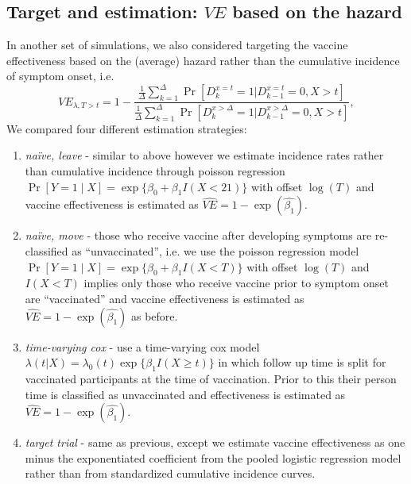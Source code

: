 \begin{appendices}
\begin{refsection}
    \subsection{Target and estimation: $VE$ based on the hazard}
    In another set of simulations, we also considered targeting the vaccine effectiveness based on the  (average) hazard rather than the cumulative incidence of symptom onset, i.e.
    $$
    VE_{\lambda,T > t} = 1 - \dfrac{\frac{1}{\Delta}\sum_{k=1}^{\Delta}\Pr[D_k^{x = t} = 1 | D_{k-1}^{x=t} = 0, X > t]}{\frac{1}{\Delta}\sum_{k=1}^{\Delta}\Pr[D_k^{x > \Delta} = 1 | D_{k-1}^{x > \Delta} = 0, X > t]},
    $$
    We compared four different estimation strategies:
    \begin{enumerate}
        \item \textit{na\"{i}ve, leave} - similar to above however we estimate incidence rates rather than cumulative incidence through poisson regression $\Pr[Y = 1 \mid X] = \operatorname{exp}\{\beta_0 + \beta_1 I(X < 21)\}$ with offset $\log(T)$ and vaccine effectiveness is estimated as $\widehat{VE} = 1 - \exp(\widehat{\beta_1})$.
        \item \textit{na\"{i}ve, move} - those who receive vaccine after developing symptoms are re-classified as ``unvaccinated'', i.e. we use the poisson regression model $\Pr[Y = 1 \mid X] = \operatorname{exp}\{\beta_0 + \beta_1 I(X < T)\}$ with offset $\log(T)$ and $I(X<T)$ implies only those who receive vaccine prior to symptom onset are ``vaccinated'' and vaccine effectiveness is estimated as $\widehat{VE} = 1 - \exp(\widehat{\beta_1})$ as before.
        \item \textit{time-varying cox} - use a time-varying cox model $\lambda(t|X) = \lambda_0(t) \exp\{\beta_1 I(X \geq t)\}$ in which follow up time is split for vaccinated participants at the time of vaccination. Prior to this their person time is classified as unvaccinated and effectiveness is estimated as $\widehat{VE} = 1 - \exp(\widehat{\beta_1})$.
        \item \textit{target trial} - same as previous, except  we estimate vaccine effectiveness as one minus the exponentiated coefficient from the pooled logistic regression model rather than from standardized cumulative incidence curves.
    \end{enumerate}


\end{refsection}
\end{appendices}
